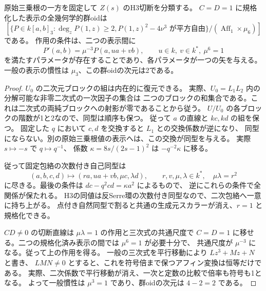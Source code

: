 \begin{corollary}\label{cor:cubic-CY-one-segre-square-split-resonance-groupoid}
原始三乗根の一方を固定して $Z(s)$ のH3切断を分類する。
$C=D=1$ に規格化した表示の全幾何学的群oidは
\[
 \left[
 \{P\in k[a,b]_3:\deg_zP(1,z)\ge2, P(1,z)^2-4\nu^3\text{ が平方自由}\}
 \big/
 (\operatorname{Aff}_1\times\mu_6)
 \right]
\]
である。
作用の条件は、二つの表示間に
\[
 P'(a,b)=\mu^{-3}P(a,u a+v b),\qquad
 u\in k,\ v\in k^*,\ \mu^6=1
\]
を満たすパラメータが存在することであり、各パラメータが一つの矢を与える。
一般の表示の慣性は $\mu_3$、この群oidの次元は2である。
\end{corollary}
\begin{proof}
$U_0$ の二次元ブロックの組は内在的に復元できる。
実際、$U_0=L_1L_2$ 内の分解可能な非零二次式の一次因子の集合は
二つのブロックの和集合である。これは二次式の両純ブロックへの射影が零であることから従う。
$U/U_0$ の各ブロックの階数が1と2なので、同型は順序も保つ。
従って $a$ の直線と $kc,kd$ の組を保つ。
固定した $q$ において $c,d$ を交換すると $L_1$ との交換係数が逆になり、
同型にならない。別の原始三乗根値の表示へは、この交換が同型を与える。
実際 $s\mapsto-s$ で $q\mapsto q^{-1}$、
係数 $\kappa=8s/(2s-1)^2$ は $-q^{-2}\kappa$ に移る。

従って固定包絡の次数付き自己同型は
\[
 (a,b,c,d)\longmapsto (r a,u a+v b,\mu c,\lambda d),
 \qquad r,v,\mu,\lambda\in k^*,\quad \mu\lambda=r^2
\]
に尽きる。最後の条件は $dc-q^2cd=\kappa a^2$ によるもので、
逆にこれらの条件で全関係が保たれる。
H3の同値は反Serre環の次数付き同型なので、二次包絡へ一意に持ち上がる。
点付き自然同型で割ると共通の生成元スカラーが消え、$r=1$ と規格化できる。

$CD\ne0$ の切断直線は $\mu\lambda=1$ の作用と三次式の共通尺度で
$C=D=1$ に移せる。二つの規格化済み表示の間では $\mu^6=1$ が必要十分で、
共通尺度が $\mu^{-3}$ になる。従って上の作用を得る。
一般の三次式を平行移動により $L z^3+M z+N$ と書き、
$LMN\ne0$ とすると、これを符号倍まで保つアフィン変換は恒等だけである。
実際、二次係数で平行移動が消え、一次と定数の比較で倍率も符号も1となる。
よって一般慣性は $\mu^3=1$ であり、群oidの次元は $4-2=2$ である。
\end{proof}

